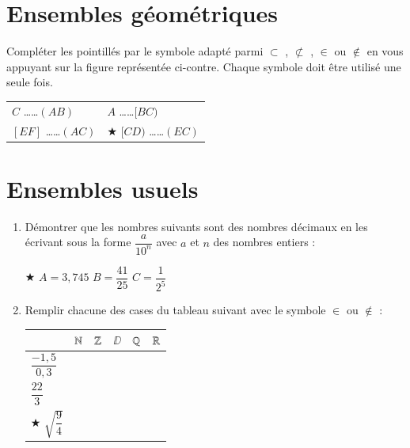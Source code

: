\documentclass[oneside,12pt]{exam}          %
\begin{document}
\section{Ensembles géométriques}
\begin{minipage}{0.6\textwidth}
	Compléter les pointillés par le symbole adapté parmi $\subset$ , $\not\subset$ , $\in$ ou $\notin$ en vous appuyant sur la figure représentée ci-contre. Chaque symbole doit être utilisé une seule fois.
	
	\renewcommand{\arraystretch}{2}
	\begin{tabular}{P{0.5\textwidth} P{0.5\textwidth}}
		$C$ \ldots\ldots $(AB)$ & $A$ \ldots\ldots $[BC)$  \\
		$[EF]$ \ldots\ldots $(AC)$ & $\bigstar$ $[CD)$ \ldots\ldots $(EC)$
	\end{tabular}
\end{minipage} \hspace{10mm}
\begin{minipage}{0.4\textwidth}
\end{minipage}



\section{Ensembles usuels}
\begin{enumerate}[itemsep = 2mm]
	\item Démontrer que les nombres suivants sont des nombres décimaux en les écrivant sous la forme $\dfrac{a}{10^n}$ avec $a$ et $n$ des nombres entiers :
	
	$\bigstar$ $A = 3,745$ \hspace{3cm} $B = \dfrac{41}{25}$ \hspace{3cm} $C = \dfrac{1}{2^5}$
	
	\item Remplir chacune des cases du tableau suivant avec le symbole $\in$ ou $\notin$ :

	\begin{center}
		\renewcommand{\arraystretch}{2}
		\begin{tabular}{| P{4cm} || P{2cm} | P{2cm} | P{2cm} | P{2cm} | P{2cm} |} \hline
			 & ${\mathbb N}$ & ${\mathbb Z}$ & $\DD$ & ${\mathbb Q}$ & ${\mathbb R}$ \\ \hline \hline
			$\dfrac{-1,5}{0,3}$ & & & & & \\ \hline
			$\dfrac{22}{3}$ & & & & & \\ \hline
			$\bigstar$ $\sqrt{\dfrac{9}{4}}$ & & & & & \\ \hline
		\end{tabular}
	\end{center}
\end{enumerate}
\end{document}
